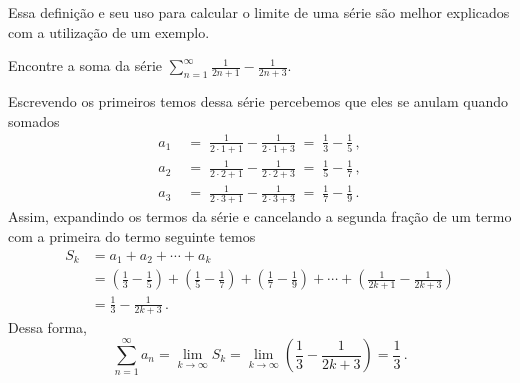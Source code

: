 Essa definição e seu uso para calcular o limite de uma série são melhor
explicados com a utilização de um exemplo.

\begin{example}
  Encontre a soma da série
  \(
    \sum_{n=1}^\infty \frac{1}{2n+1} - \frac{1}{2n+3}
  \).

  \solution
  Escrevendo os primeiros temos dessa série percebemos que eles se anulam quando somados
  \begin{align*}
  a_1 & \;=\; \frac{1}{2\cdot 1+1}-\frac{1}{2\cdot 1+3} \;=\; \frac{1}{3}-\frac{1}{5} \,,\\[2mm]
  a_2 & \;=\; \frac{1}{2\cdot 2+1}-\frac{1}{2\cdot 2+3} \;=\; \frac{1}{5}-\frac{1}{7} \,,\\[2mm]
  a_3 & \;=\; \frac{1}{2\cdot 3+1}-\frac{1}{2\cdot 3+3} \;=\; \frac{1}{7}-\frac{1}{9} \,.
  \end{align*}
  Assim, expandindo os termos da série e cancelando a segunda
  fração de um termo com a primeira do termo seguinte temos
  \begin{align*}
  	S_k & = a_1 + a_2 + \cdots + a_k \\
        & = \left( \frac{1}{3}    - \frac{1}{5}    \right)
          + \left( \frac{1}{5}    - \frac{1}{7}    \right)
          + \left( \frac{1}{7}    - \frac{1}{9}    \right) + \cdots
          + \left( \frac{1}{2k+1} - \frac{1}{2k+3} \right) \\[2mm]
  	    & = \frac{1}{3}-\frac{1}{2k+3}  \,.
  \end{align*}
  Dessa forma,
  \[
    \sum_{n=1}^\infty a_n
    = \lim_{k\to \infty} S_k
    = \lim_{k\to \infty} \left( \frac{1}{3}-\frac{1}{2k+3} \right)
    = \frac{1}{3}   \,.
  \]
\end{example}


